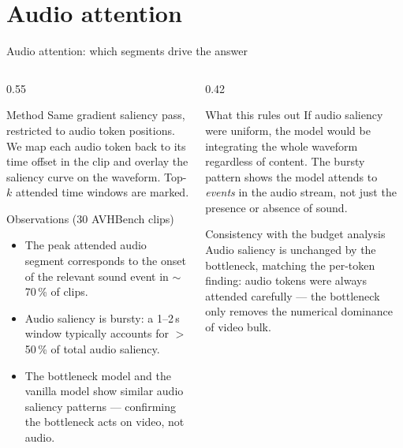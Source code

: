 \documentclass[10pt,aspectratio=169]{beamer}
\begin{document}
\section{Audio attention}

\begin{frame}{Audio attention: which segments drive the answer}

\begin{columns}[T]
\begin{column}{0.55\textwidth}

\begin{block}{Method}
{\footnotesize
Same gradient saliency pass, restricted to audio token positions. We map each
audio token back to its time offset in the clip and overlay the saliency curve on
the waveform. Top-$k$ attended time windows are marked.}
\end{block}

\begin{block}{Observations (30 AVHBench clips)}
{\footnotesize
\begin{itemize}\setlength\itemsep{2pt}
  \item The peak attended audio segment corresponds to the onset of the relevant
        sound event in $\sim$70\,\% of clips.
  \item Audio saliency is bursty: a 1--2\,s window typically accounts for $>$50\,\%
        of total audio saliency.
  \item The bottleneck model and the vanilla model show similar audio saliency
        patterns --- confirming the bottleneck acts on video, not audio.
\end{itemize}}
\end{block}

\end{column}

\begin{column}{0.42\textwidth}

\begin{block}{What this rules out}
{\footnotesize
If audio saliency were uniform, the model would be integrating the whole waveform
regardless of content. The bursty pattern shows the model attends to
\emph{events} in the audio stream, not just the presence or absence of sound.}
\end{block}

\begin{block}{Consistency with the budget analysis}
{\footnotesize
Audio saliency is unchanged by the bottleneck, matching the per-token finding:
audio tokens were always attended carefully --- the bottleneck only removes the
numerical dominance of video bulk.}
\end{block}

\end{column}
\end{columns}

\end{frame}
\end{document}
